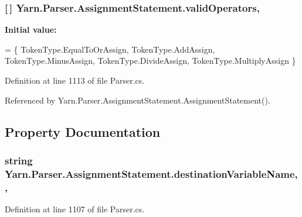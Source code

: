 \hypertarget{a00041_af3d393da2f684272251805d3471b6c7a}{
\subsubsection[{valid\-Operators}]{ \mbox{[}$\,$\mbox{]} Yarn.\-Parser.\-Assignment\-Statement.\-valid\-Operators\hspace{0.3cm}{\ttfamily [static]}, {\ttfamily [private]}}}\label{a00041_af3d393da2f684272251805d3471b6c7a}
{\bfseries Initial value\-:}
\begin{DoxyCode}
= \{
                TokenType.EqualToOrAssign,
                TokenType.AddAssign,
                TokenType.MinusAssign,
                TokenType.DivideAssign,
                TokenType.MultiplyAssign
            \}
\end{DoxyCode}


Definition at line 1113 of file Parser.\-cs.



Referenced by Yarn.\-Parser.\-Assignment\-Statement.\-Assignment\-Statement().



\subsection{Property Documentation}
\hypertarget{a00041_a4e764622b716a4138d1fd9e005c41336}{
\subsubsection[{destination\-Variable\-Name}]{\setlength{\rightskip}{0pt plus 5cm}string Yarn.\-Parser.\-Assignment\-Statement.\-destination\-Variable\-Name\hspace{0.3cm}{\ttfamily [get]}, {\ttfamily [set]}, {\ttfamily [package]}}}\label{a00041_a4e764622b716a4138d1fd9e005c41336}


Definition at line 1107 of file Parser.\-cs.



